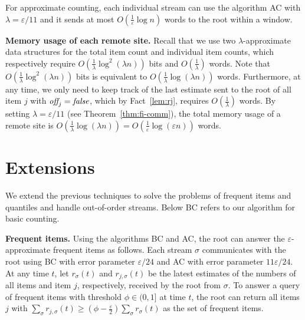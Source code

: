 \documentclass[proceedings]{stacs}
\theoremstyle{definition}\newtheorem{fact}{Fact}
\newcommand{\rs}{r_\sigma}
\newcommand{\rjs}{r_{j,\sigma}}
\newcommand{\off}{\mbox{\it off}_{j}}
\newcommand{\false}{\mbox{\it false}}
\begin{document}
\begin{theorem} \label{thm:fi-comm}
For approximate counting,
each individual stream can use the algorithm AC
with $\lambda = \varepsilon / 11$ and
it sends at most $O( \frac{1}{\varepsilon} \log n )$ words to the root
within a window.
\end{theorem}

{\bf Memory usage of each remote site.} Recall that we use two $\lambda$-approximate data structures
\cite{DatarGIM02,LeeT06}
for the total item count and individual item counts,
which respectively require
$O(\frac{1}{\lambda} \log^2(\lambda n))$ bits
and $O(\frac{1}{\lambda})$ words.
Note that $O(\frac{1}{\lambda} \log^2(\lambda n))$ bits
is equivalent to $O(\frac{1}{\lambda} \log (\lambda n))$ words.
Furthermore, at any time,
we only need to keep track of
the last estimate sent to the root of
all item $j$ with $\off = \false$,
which by Fact~\ref{lem:rj}, requires $O(\frac{1}{\lambda})$ words.
By setting $\lambda = \varepsilon / 11$ (see Theorem~\ref{thm:fi-comm}),
the total memory usage of a remote site
is $O(\frac{1}{\lambda} \log (\lambda n))
= O(\frac{1}{\varepsilon} \log (\varepsilon n))$ words.

\section{Extensions}
\label{sec:extension}
We extend the previous techniques to solve the problems of frequent items
and quantiles and  handle out-of-order streams.
Below BC refers to our algorithm for basic counting.


\vspace{.5ex}
{\bf Frequent items.}
Using the algorithms BC and AC, the root can
answer the $\varepsilon$-approximate frequent items as follows.
Each stream $\sigma$ communicates with the root using BC
with error parameter $\varepsilon/ 24$
and AC with error parameter $11 \varepsilon/ 24$.
At any time $t$,
let $\rs(t)$ and $\rjs(t)$ be the latest estimates of
the numbers of all items and item $j$, respectively,
received by the root from $\sigma$.  To answer
a query of frequent items with threshold
$\phi \in (0, 1]$ at time $t$,
the root can return all items $j$ with $\sum_\sigma \rjs(t) \ge
(\phi - \frac{\varepsilon}{2}) \sum_\sigma \rs(t)$ as the set of frequent
items.
\end{document}
